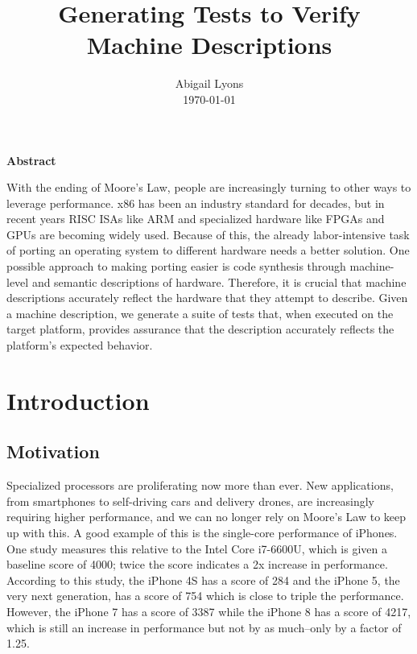 \documentclass[letterpaper,12pt]{article}
\begin{document}
\title{\bf \LARGE Generating Tests to Verify Machine Descriptions}

\author{
{\rm Abigail Lyons}\\
{\rm \today}
}
\maketitle
\thispagestyle{empty}

\vspace*{2\baselineskip}
{\centering
  \bf{Abstract}\par
}
With the ending of Moore's Law, people are increasingly turning to other ways to leverage performance. x86 has been an industry standard for decades, but in recent years RISC ISAs like ARM and specialized hardware like FPGAs and GPUs are becoming widely used. Because of this, the already labor-intensive task of porting an operating system to different hardware needs a better solution. One possible approach to making porting easier is code synthesis through machine-level and semantic descriptions of hardware. Therefore, it is crucial that machine descriptions accurately reflect the hardware that they attempt to describe. Given a machine description, we generate a suite of tests that, when executed on the target platform, provides assurance that the description accurately reflects the platform's expected behavior.

\pagebreak

\tableofcontents

\pagebreak

\section{Introduction}

\subsection{Motivation}

Specialized processors are proliferating now more than ever. New applications, from smartphones to self-driving cars and delivery drones, are increasingly requiring higher performance, and we can no longer rely on Moore's Law to keep up with this. A good example of this is the single-core performance of iPhones. One study measures this relative to the Intel Core i7-6600U, which is given a baseline score of 4000; twice the score indicates a 2x increase in performance. According to this study, the iPhone 4S has a score of 284 and the iPhone 5, the very next generation, has a score of 754 which is close to triple the performance. However, the iPhone 7 has a score of 3387 while the iPhone 8 has a score of 4217, which is still an increase in performance but not by as much--only by a factor of 1.25\cite{iPhone}.
\end{document}
